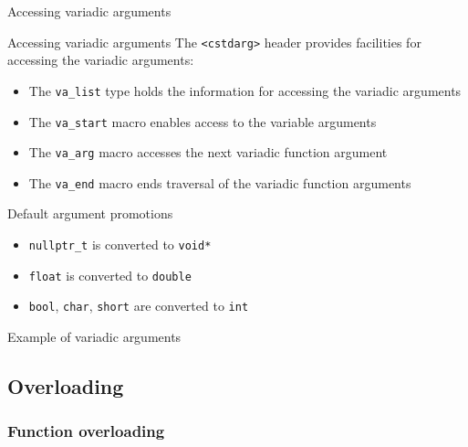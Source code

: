 \begin{frame}{Accessing variadic arguments}{}
  \begin{block}{Accessing variadic arguments}
    The \lstinline!<cstdarg>! header provides facilities for accessing the variadic arguments:
    \begin{itemize}
    \item
      The \lstinline!va_list! type holds the information for accessing the variadic arguments
    \item
      The \lstinline!va_start! macro enables access to the variable arguments
    \item
      The \lstinline!va_arg! macro accesses the next variadic function argument
    \item
      The \lstinline!va_end! macro ends traversal of the variadic function arguments
    \end{itemize}
  \end{block}

  \begin{block}{Default argument promotions}
    \begin{itemize}
    \item
      \lstinline!nullptr_t! is converted to \lstinline!void*!
    \item
      \lstinline!float! is converted to \lstinline!double!
    \item
      \lstinline!bool!, \lstinline!char!, \lstinline!short! are converted to \lstinline!int!
    \end{itemize}
  \end{block}
\end{frame}

\begin{frame}{Example of variadic arguments}{}
  \begin{example}
  \end{example}
\end{frame}


\subsection{Overloading}

\subsubsection{Function overloading}

